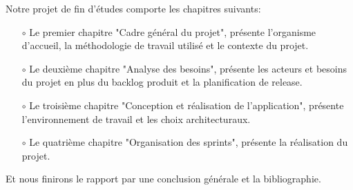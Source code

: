Notre projet de fin d'études comporte les chapitres suivants:\\
\begin{itemize}
    \item[$\circ$] Le premier chapitre "Cadre général du projet", présente l'organisme d'accueil, la méthodologie de travail utilisé et le contexte du projet.
    \item[$\circ$] Le deuxième chapitre "Analyse des besoins", présente les acteurs et besoins du projet en plus du backlog produit et la planification de release.
    \item[$\circ$] Le troisième chapitre "Conception et réalisation de l'application", présente l'environnement de travail et les choix architecturaux.
    \item[$\circ$] Le quatrième chapitre "Organisation des sprints", présente la réalisation du projet.\\
\end{itemize}
Et nous finirons le rapport par une conclusion générale et la bibliographie.